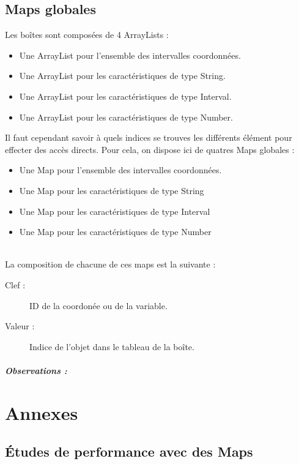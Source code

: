 \section{Maps globales}
Les boîtes sont composées  de 4 ArrayLists : 
\begin{itemize}
  \item Une ArrayList pour l'ensemble des intervalles coordonnées.
  \item Une ArrayList pour les caractéristiques de type String.
  \item Une ArrayList pour les caractéristiques de type Interval.
  \item Une ArrayList pour les caractéristiques de type Number.
\end{itemize}
Il faut cependant savoir à quels indices se trouves les différents élément pour effecter des accès directs. Pour cela, on dispose ici de quatres Maps globales :
\begin{itemize}
  \item Une Map pour l'ensemble des intervalles coordonnées.
  \item Une Map pour les caractéristiques de type String
  \item Une Map pour les caractéristiques de type Interval
  \item Une Map pour les caractéristiques de type Number
\end{itemize}\\
La composition de chacune de ces maps est la suivante :  
\begin{description}
 \item[Clef :]
ID de la coordonée ou de la variable.
\item[Valeur :]
Indice de l'objet dans le tableau de la boîte.
\end{description}


\paragraph{Observations :}


\appendix

\chapter{Annexes}
\section{Études de performance avec des Maps}

